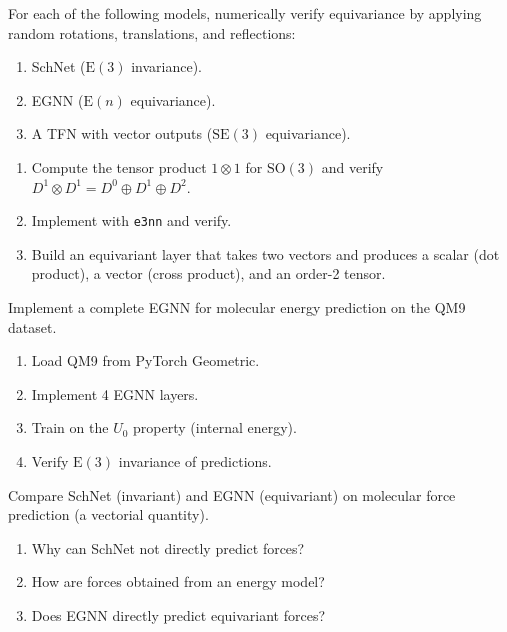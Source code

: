 \begin{exercise}
For each of the following models, numerically verify equivariance by applying
random rotations, translations, and reflections:
\begin{enumerate}
    \item SchNet ($\mathrm{E}(3)$ invariance).
    \item EGNN ($\mathrm{E}(n)$ equivariance).
    \item A TFN with vector outputs ($\mathrm{SE}(3)$ equivariance).
\end{enumerate}
\end{exercise}

\begin{exercise}
\begin{enumerate}
    \item Compute the tensor product $1 \otimes 1$ for $\mathrm{SO}(3)$ and
          verify $D^1 \otimes D^1 = D^0 \oplus D^1 \oplus D^2$.
    \item Implement with \texttt{e3nn} and verify.
    \item Build an equivariant layer that takes two vectors and produces a
          scalar (dot product), a vector (cross product), and an order-2 tensor.
\end{enumerate}
\end{exercise}

\begin{exercise}
Implement a complete EGNN for molecular energy prediction on the QM9 dataset.
\begin{enumerate}
    \item Load QM9 from PyTorch Geometric.
    \item Implement 4 EGNN layers.
    \item Train on the $U_0$ property (internal energy).
    \item Verify $\mathrm{E}(3)$ invariance of predictions.
\end{enumerate}
\end{exercise}

\begin{exercise}
Compare SchNet (invariant) and EGNN (equivariant) on molecular force prediction
(a vectorial quantity).
\begin{enumerate}
    \item Why can SchNet not directly predict forces?
    \item How are forces obtained from an energy model?
    \item Does EGNN directly predict equivariant forces?
\end{enumerate}
\end{exercise}
